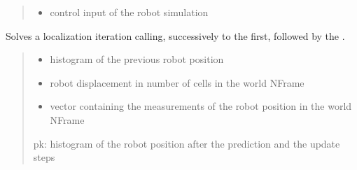 \documentclass[letterpaper,10pt,english]{sphinxmanual}
\begin{document}
\begin{fulllineitems}
\begin{fulllineitems}
\begin{quote}
\begin{description}
\begin{itemize}
\item {} 
\sphinxAtStartPar
{} \textendash{} control input of the robot simulation

\end{itemize}

\end{description}\end{quote}

\end{fulllineitems}


\begin{fulllineitems}
\label{\detokenize{GridLocalization:GL.GL.Localize}}
\pysigstartsignatures
{}
\pysigstopsignatures
\sphinxAtStartPar
Solves a localization iteration calling, successively to the  first, followed by the .
\begin{quote}\begin{description}
\begin{itemize}
\item {} 
\sphinxAtStartPar
{} \textendash{} histogram of the previous robot position

\item {} 
\sphinxAtStartPar
{} \textendash{} robot displacement in number of cells in the world N\sphinxhyphen{}Frame

\item {} 
\sphinxAtStartPar
{} \textendash{} vector containing the measurements of the robot position in the world N\sphinxhyphen{}Frame

\end{itemize}

\sphinxAtStartPar
pk: histogram of the robot position after the prediction and the update steps

\end{description}\end{quote}

\end{fulllineitems}


\end{fulllineitems}
\end{document}
